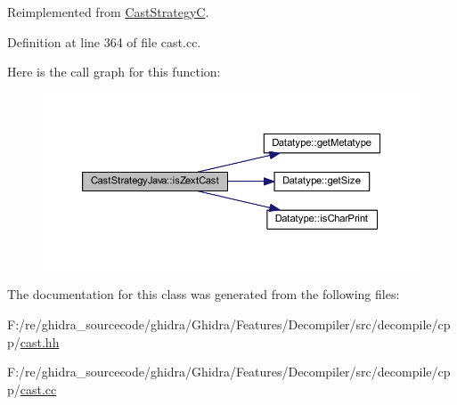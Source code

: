 Reimplemented from \mbox{\hyperlink{class_cast_strategy_c_a5c4b61d624a78a2e6f16bf2902e5b8e6}{Cast\+StrategyC}}.



Definition at line 364 of file cast.\+cc.

Here is the call graph for this function\+:
\nopagebreak
\begin{figure}[H]
\begin{center}
\leavevmode
\includegraphics[width=350pt]{class_cast_strategy_java_a6c8536d19ca90746652c78d0781e98b6_cgraph}
\end{center}
\end{figure}


The documentation for this class was generated from the following files\+:\begin{DoxyCompactItemize}
\item 
F\+:/re/ghidra\+\_\+sourcecode/ghidra/\+Ghidra/\+Features/\+Decompiler/src/decompile/cpp/\mbox{\hyperlink{cast_8hh}{cast.\+hh}}\item 
F\+:/re/ghidra\+\_\+sourcecode/ghidra/\+Ghidra/\+Features/\+Decompiler/src/decompile/cpp/\mbox{\hyperlink{cast_8cc}{cast.\+cc}}\end{DoxyCompactItemize}
